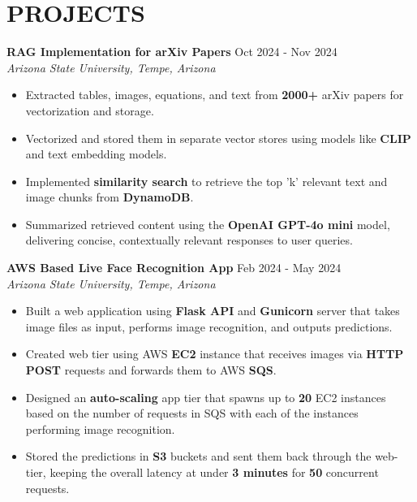 \documentclass[a4paper,9pt]{extarticle}
\begin{document}
\section*{PROJECTS}

\noindent
\textbf{RAG Implementation for arXiv Papers} \hfill Oct 2024 - Nov 2024\\%
\textit{Arizona State University, Tempe, Arizona}
\begin{itemize}
    
    \item Extracted tables, images, equations, and text from \textbf{2000+} arXiv papers for vectorization and storage.
    \item Vectorized and stored them in separate vector stores using models like \textbf{CLIP} and text embedding models.
    \item Implemented \textbf{similarity search} to retrieve the top 'k' relevant text and image chunks from \textbf{DynamoDB}.
    \item Summarized retrieved content using the \textbf{OpenAI GPT-4o mini} model, delivering concise, contextually relevant responses to user queries.
\end{itemize}

\noindent
\textbf{AWS Based Live Face Recognition App}  \hfill Feb 2024 - May 2024\\ %
\textit{Arizona State University, Tempe, Arizona} %
\begin{itemize}
    \item Built a web application using \textbf{Flask API} and \textbf{Gunicorn} server that takes image files as input, performs image recognition, and outputs predictions.
    \item Created web tier using AWS \textbf{EC2} instance that receives images via \textbf{HTTP POST} requests and forwards them to AWS \textbf{SQS}.
    \item Designed an \textbf{auto-scaling} app tier that spawns up to \textbf{20} EC2 instances based on the number of requests in SQS with each of the instances performing image recognition.
    \item Stored the predictions in \textbf{S3} buckets and sent them back through the web-tier, keeping the overall latency at under \textbf{3 minutes} for \textbf{50} concurrent requests.
    
\end{itemize}
\end{document}
